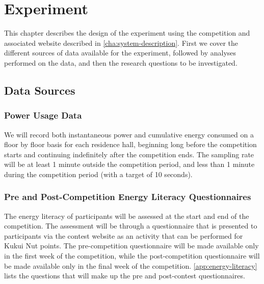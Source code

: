 \chapter{Experiment}

This chapter describes the design of the experiment using the competition and associated website described in \autoref{cha:system-description}. First we cover the different sources of data available for the experiment, followed by analyses performed on the data, and then the research questions to be investigated. 

\section{Data Sources}

\subsection{Power Usage Data}
\label{sec:power-usage-data}

We will record both instantaneous power and cumulative energy consumed on a floor by floor basis for each residence hall, beginning long before the competition starts and continuing indefinitely after the competition ends. The sampling rate will be at least 1 minute outside the competition period, and less than 1 minute during the competition period (with a target of 10 seconds).

\subsection{Pre and Post-Competition Energy Literacy Questionnaires}
\label{sec:exp-literacy-questionnaire}

The energy literacy of participants will be assessed at the start and end of the competition. The assessment will be through a questionnaire that is presented to participants via the contest website as an activity that can be performed for Kukui Nut points. The pre-competition questionnaire will be made available only in the first week of the competition, while the post-competition questionnaire will be made available only in the final week of the competition. \autoref{app:energy-literacy} lists the questions that will make up the pre and post-contest questionnaires.

